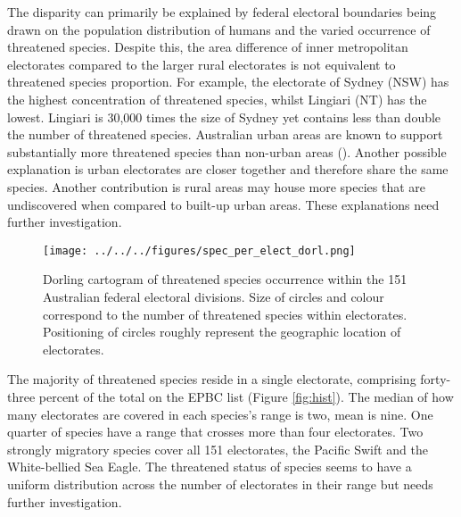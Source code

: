 \documentclass[a4paper,11pt]{article}
\begin{document}
The disparity can primarily be explained by federal electoral boundaries being drawn on the population distribution of humans and the varied occurrence of threatened species. Despite this, the area difference of inner metropolitan electorates compared to the larger rural electorates is not equivalent to threatened species proportion. For example, the electorate of Sydney (NSW) has the highest concentration of threatened species, whilst Lingiari (NT) has the lowest. Lingiari is 30,000 times the size of Sydney yet contains less than double the number of threatened species. Australian urban areas are known to support substantially more threatened species than non-urban areas (\cite{ivesCitiesAreHotspots2016, soanesConservationOpportunitiesThreatened2020}). Another possible explanation is urban electorates are closer together and therefore share the same species. Another contribution is rural areas may house more species that are undiscovered when compared to built-up urban areas. These explanations need further investigation.

\begin{figure}[H]
	\centering
    \texttt{[image: ../../../figures/spec\_per\_elect\_dorl.png]}
    \caption{Dorling cartogram of threatened species occurrence within the 151 Australian federal electoral divisions. Size of circles and colour correspond to the number of threatened species within electorates. Positioning of circles roughly represent the geographic location of electorates.}
    \label{fig:dorl}
\end{figure}


The majority of threatened species reside in a single electorate, comprising forty-three percent of the total on the EPBC list (Figure \ref{fig:hist}). The median of how many electorates are covered in each species's range is two, mean is nine. One quarter of species have a range that crosses more than four electorates. Two strongly migratory species cover all 151 electorates, the Pacific Swift and the White-bellied Sea Eagle. The threatened status of species seems to have a uniform distribution across the number of electorates in their range but needs further investigation.
\end{document}
